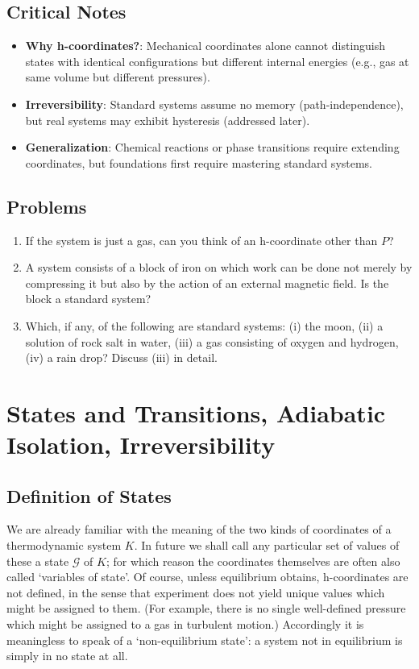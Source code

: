 \documentclass{article}
\theoremstyle{definition}
\begin{document}
\subsection*{Critical Notes}
\begin{itemize}
    \item \textbf{Why h-coordinates?}: Mechanical coordinates alone cannot distinguish states with identical configurations but different internal energies (e.g., gas at same volume but different pressures).
    \item \textbf{Irreversibility}: Standard systems assume no memory (path-independence), but real systems may exhibit hysteresis (addressed later).
    \item \textbf{Generalization}: Chemical reactions or phase transitions require extending coordinates, but foundations first require mastering standard systems.
\end{itemize}

\subsection{Problems}
\begin{enumerate}
\item If the system is just a gas, can you think of an h-coordinate other than \( P \)?
\item A system consists of a block of iron on which work can be done not merely by compressing it but also by the action of an external magnetic field. Is the block a standard system?
\item Which, if any, of the following are standard systems: (i) the moon, (ii) a solution of rock salt in water, (iii) a gas consisting of oxygen and hydrogen, (iv) a rain drop? Discuss (iii) in detail.
\end{enumerate}


\section{States and Transitions, Adiabatic Isolation, Irreversibility}

\subsection{Definition of States}
We are already familiar with the meaning of the two kinds of coordinates of a thermodynamic system \( K \). In future we shall call any particular set of values of these a state \(\mathcal{G}\) of \( K \); for which reason the coordinates themselves are often also called ‘variables of state’. Of course, unless equilibrium obtains, h-coordinates are not defined, in the sense that experiment does not yield unique values which might be assigned to them. (For example, there is no single well-defined pressure which might be assigned to a gas in turbulent motion.) Accordingly it is meaningless to speak of a ‘non-equilibrium state’: a system not in equilibrium is simply in no state at all.
\end{document}
